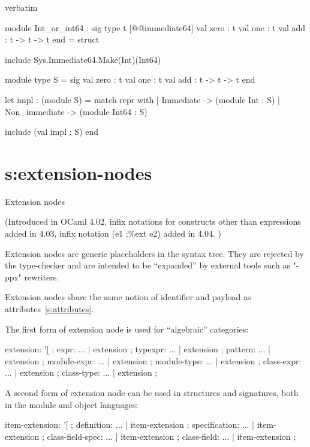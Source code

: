 \begin{camlexample}{verbatim}
\begin{caml}
\begin{camlinput}
module Int_or_int64 : sig
  type t [@@immediate64]
  val zero : t
  val one : t
  val add : t -> t -> t
end = struct

  include Sys.Immediate64.Make(Int)(Int64)

  module type S = sig
    val zero : t
    val one : t
    val add : t -> t -> t
  end

  let impl : (module S) =
    match repr with
    | Immediate ->
        (module Int : S)
    | Non_immediate ->
        (module Int64 : S)

  include (val impl : S)
end
\end{camlinput}
\end{caml}
\end{camlexample}

\section{s:extension-nodes}{Extension nodes}

(Introduced in OCaml 4.02,
infix notations for constructs other than expressions added in 4.03,
infix notation (e1 ;\%ext e2) added in 4.04.
)

Extension nodes are generic placeholders in the syntax tree. They are
rejected by the type-checker and are intended to be ``expanded'' by external
tools such as "-ppx" rewriters.

Extension nodes share the same notion of identifier and payload as
attributes~\ref{s:attributes}.

The first form of extension node is used for ``algebraic'' categories:

\begin{syntax}
extension:
    '[%
;
expr: ...
     | extension
;
typexpr: ...
     | extension
;
pattern: ...
     | extension
;
module-expr: ...
     | extension
;
module-type: ...
     | extension
;
class-expr: ...
     | extension
;
class-type: ...
     | extension
;
\end{syntax}

A second form of extension node can be used in structures and
signatures, both in the module and object languages:

\begin{syntax}
item-extension:
    '[%
;
definition: ...
   | item-extension
;
specification: ...
   | item-extension
;
class-field-spec: ...
   | item-extension
;
class-field: ...
   | item-extension
;
\end{syntax}

